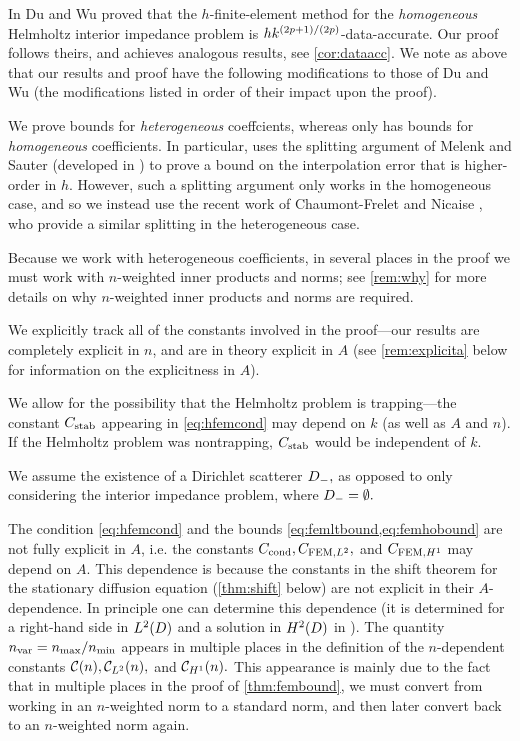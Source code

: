 In \cite{DuWu:15} Du and Wu proved that the $h$-finite-element method for the \emph{homogeneous} Helmholtz interior impedance problem is $hk^{(2p+1)/(2p)}$-data-accurate.  Our proof follows theirs, and achieves analogous results, see \cref{cor:dataacc}. We note as above that our results and proof have the following modifications to those of Du and Wu (the modifications listed in order of their impact upon the proof).
\ben
\item We prove bounds for \emph{heterogeneous} coeffcients, whereas \cite{DuWu:15} only has bounds for \emph{homogeneous}  coefficients. In particular, \cite{DuWu:15} uses the splitting argument of Melenk and Sauter (developed in \cite{MeSa:10,MeSa:11}) to prove a bound on the interpolation error that is higher-order in $h$. However, such a splitting argument only works in the homogeneous case, and so we instead use the recent work of Chaumont-Frelet and Nicaise \cite{ChNi:19}, who provide a similar splitting in the heterogeneous case.
\item  Because we work with heterogeneous coefficients, in several places in the proof we must work with $n$-weighted inner products and norms; see \cref{rem:why} for more details on why $n$-weighted inner products and norms are required.
\item We explicitly track all of the constants involved in the proof---our results are completely explicit in $n$, and are in theory explicit in $A$ (see \cref{rem:explicita} below for information on the explicitness in $A$).
\item We allow for the possibility that the Helmholtz problem is trapping---the constant $C_{\mathrm{stab}}$ appearing in \cref{eq:hfemcond} may depend on $k$ (as well as $A$ and $n$). If the Helmholtz problem was nontrapping, $C_{\mathrm{stab}}$ would be independent of $k$.
  \item We assume the existence of a Dirichlet scatterer $D_{-},$ as opposed to only considering the interior impedance problem, where $D_{-}=\emptyset.$
\een
\ere

\label{rem:explicita}
The condition \cref{eq:hfemcond} and the bounds \cref{eq:femltbound,eq:femhobound} are not fully explicit in $A$, i.e. the constants $C_{\mathrm{cond}}, C_{\mathrm{FEM},L^{2}},$ and $C_{\mathrm{FEM},H^{1}}$ may depend on $A$. This dependence is because the constants in the shift theorem for the stationary diffusion equation (\cref{thm:shift} below) are not explicit in their $A$-dependence. In principle one can determine this dependence (it is determined for a right-hand side in $\LtD$ and a solution in $\HtD$ in \cite[Appendix A]{ChScTe:13}).
\ere
{}\label{rem:nvar}
The quantity $n_{\mathrm{var}} = n_{\max}/n_{\min}$ appears in multiple places in the definition of the $n$-dependent constants $\mathcal C(n), \mathcal C_{L^{2}}(n),$ and $\mathcal C_{H^{1}}(n).$ This appearance is mainly due to the fact that in multiple places in the proof of \cref{thm:fembound}, we must convert from working in an $n$-weighted norm to a standard norm, and then later convert back to an $n$-weighted norm again.

